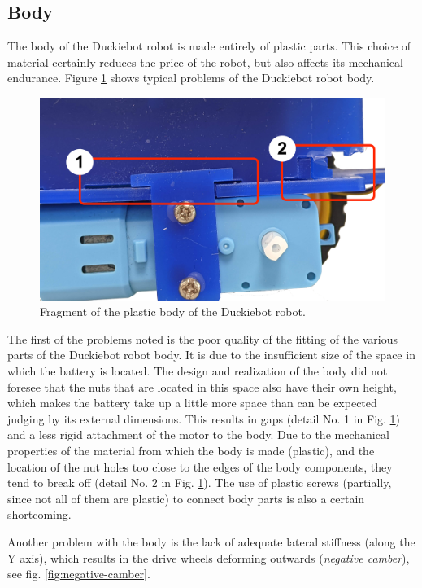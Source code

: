 \documentclass[conference]{IEEEtran}
\begin{document}
\subsection{Body}
The body of the Duckiebot robot is made entirely of plastic parts. This choice of material certainly reduces the price of the robot, but also affects its mechanical endurance. Figure \ref{fig:chassis-problem} shows typical problems of the Duckiebot robot body.

\begin{figure}
    \centering
    \includegraphics[width=1.0\columnwidth]{chassis1.png}
    \caption{Fragment of the plastic body of the Duckiebot robot.}
    \label{fig:chassis-problem}
\end{figure}

The first of the problems noted is the poor quality of the fitting of the various parts of the Duckiebot robot body. It is due to the insufficient size of the space in which the battery is located. The design and realization of the body did not foresee that the nuts that are located in this space also have their own height, which makes the battery take up a little more space than can be expected judging by its external dimensions. This results in gaps (detail No. 1 in Fig. \ref{fig:chassis-problem}) and a less rigid attachment of the motor to the body. Due to the mechanical properties of the material from which the body is made (plastic), and the location of the nut holes too close to the edges of the body components, they tend to break off (detail No. 2 in Fig. \ref{fig:chassis-problem}). The use of plastic screws (partially, since not all of them are plastic) to connect body parts is also a certain shortcoming.

Another problem with the body is the lack of adequate lateral stiffness (along the Y axis), which results in the drive wheels deforming outwards (\emph{negative camber}), see fig. \ref{fig:negative-camber}. 
\end{document}
